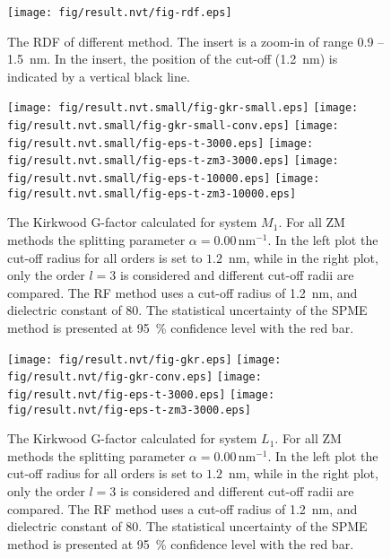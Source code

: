 \documentclass[aip,jcp,a4paper,preprint,unsortedaddress,onecolumn,fleqn]{revtex4-1}
\newcommand{\systemmb}{M_1}
\newcommand{\systemlb}{L_1}
\begin{document}
\begin{figure}
  \centering
  \texttt{[image: fig/result.nvt/fig-rdf.eps]}  
  \caption{The RDF of different method. The insert is a zoom-in of range 0.9 -- 1.5~nm. In the insert, the position of the cut-off (1.2~nm) is indicated by a vertical black line.}
  \label{fig:rdf}
\end{figure}


\begin{figure}
  \centering
  \texttt{[image: fig/result.nvt.small/fig-gkr-small.eps]}
  \texttt{[image: fig/result.nvt.small/fig-gkr-small-conv.eps]}
  \texttt{[image: fig/result.nvt.small/fig-eps-t-3000.eps]}
  \texttt{[image: fig/result.nvt.small/fig-eps-t-zm3-3000.eps]}
  \texttt{[image: fig/result.nvt.small/fig-eps-t-10000.eps]}
  \texttt{[image: fig/result.nvt.small/fig-eps-t-zm3-10000.eps]}
  \caption{The Kirkwood G-factor calculated for system $\systemmb$.
    For all ZM methods the splitting parameter $\alpha = 0.00\,\textrm{nm}^{-1}$.
    In the left plot the cut-off radius for all orders is set to $1.2$~nm, while
    in the right plot, only the order $l=3$ is considered and different cut-off radii are compared.
    The RF method uses a cut-off radius of 1.2~nm, and dielectric constant of 80.
    The statistical uncertainty of the SPME method is presented at 95~\% confidence level with the red bar.
  }
  \label{fig:tmp1}
\end{figure}

\begin{figure}
  \centering
  \texttt{[image: fig/result.nvt/fig-gkr.eps]}
  \texttt{[image: fig/result.nvt/fig-gkr-conv.eps]}
  \texttt{[image: fig/result.nvt/fig-eps-t-3000.eps]}
  \texttt{[image: fig/result.nvt/fig-eps-t-zm3-3000.eps]}
  \caption{The Kirkwood G-factor calculated for system $\systemlb$.
    For all ZM methods the splitting parameter $\alpha = 0.00\,\textrm{nm}^{-1}$.
    In the left plot the cut-off radius for all orders is set to $1.2$~nm, while
    in the right plot, only the order $l=3$ is considered and different cut-off radii are compared.
    The RF method uses a cut-off radius of 1.2~nm, and dielectric constant of 80.
    The statistical uncertainty of the SPME method is presented at 95~\% confidence level with the red bar.
  }
  \label{fig:tmp2}
\end{figure}
\end{document}
